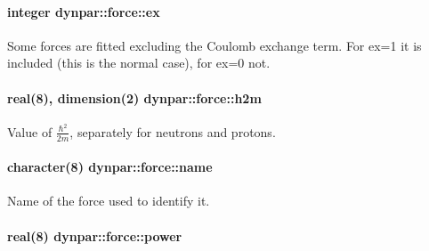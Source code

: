 \paragraph[{\texorpdfstring{ex}{ex}}]{\setlength{\rightskip}{0pt plus 5cm}integer dynpar\+::force\+::ex}\hypertarget{structdynpar_1_1force_aa99fc3f79a03fa315151ac8fc8034ed1}{}\label{structdynpar_1_1force_aa99fc3f79a03fa315151ac8fc8034ed1}


Some forces are fitted excluding the Coulomb exchange term. For {\ttfamily  ex=1 } it is included (this is the normal case), for {\ttfamily  ex=0 } not. 

\paragraph[{\texorpdfstring{h2m}{h2m}}]{\setlength{\rightskip}{0pt plus 5cm}real(8), dimension(2) dynpar\+::force\+::h2m}\hypertarget{structdynpar_1_1force_a7ac5c85f6e06b5efdfd37ff3d5531aa4}{}\label{structdynpar_1_1force_a7ac5c85f6e06b5efdfd37ff3d5531aa4}


Value of $ \frac{\hbar^2}{2m} $, separately for neutrons and protons. 

\paragraph[{\texorpdfstring{name}{name}}]{\setlength{\rightskip}{0pt plus 5cm}character(8) dynpar\+::force\+::name}\hypertarget{structdynpar_1_1force_ad32644ba4effee4dc9d34bb491f1809d}{}\label{structdynpar_1_1force_ad32644ba4effee4dc9d34bb491f1809d}


Name of the force used to identify it. 

\paragraph[{\texorpdfstring{power}{power}}]{\setlength{\rightskip}{0pt plus 5cm}real(8) dynpar\+::force\+::power}\hypertarget{structdynpar_1_1force_a9ca99487f86a96dad10e90915b8b2581}{}\label{structdynpar_1_1force_a9ca99487f86a96dad10e90915b8b2581}


